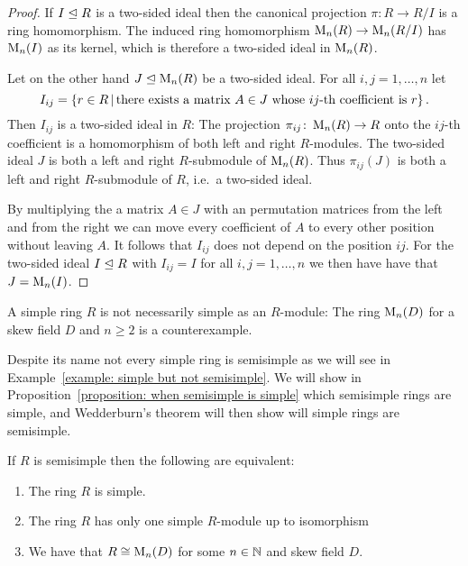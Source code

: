 \begin{proof}
  If $I \trianglelefteq R$ is a two-sided ideal then the canonical projection $\pi \colon R \to R/I$ is a ring homomorphism.
  The induced ring homomorphism $\operatorname{M}_n(R) \to \operatorname{M}_n(R/I)$ has $\operatorname{M}_n(I)$ as its kernel, which is therefore a two-sided ideal in $\operatorname{M}_n(R)$.
  
  Let on the other hand $J \trianglelefteq \operatorname{M}_n(R)$ be a two-sided ideal.
  For all $i, j = 1, \dotsc, n$ let
  \[
      I_{ij}
    = \{
        r \in R
      \suchthat
        \text{there exists a matrix $A \in J$ whose $ij$-th coefficient is $r$}
      \} \,.
  \]
  Then $I_{ij}$ is a two-sided ideal in $R$:
  The projection $\pi_{ij} \colon \operatorname{M}_n(R) \to R$ onto the $ij$-th coefficient is a homomorphism of both left and right $R$-modules.
  The two-sided ideal $J$ is both a left and right $R$-submodule of $\operatorname{M}_n(R)$.
  Thus $\pi_{ij}(J)$ is both a left and right $R$-submodule of $R$, i.e.\ a two-sided ideal.
  
  By multiplying the a matrix $A \in J$ with an permutation matrices from the left and from the right we can move every coefficient of $A$ to every other position without leaving $A$.
  It follows that $I_{ij}$ does not depend on the position $ij$.
  For the two-sided ideal $I \trianglelefteq R$ with $I_{ij} = I$ for all $i, j = 1, \dotsc, n$ we then have have that $J = \operatorname{M}_n(I)$.
\end{proof}


\begin{warning}
  A simple ring $R$ is not necessarily simple as an $R$-module:
  The ring $\operatorname{M}_n(D)$ for a skew field $D$ and $n \geq 2$ is a counterexample.
\end{warning}


\begin{fluff}
  Despite its name not every simple ring is semisimple as we will see in Example~\ref{example: simple but not semisimple}.
  We will show in Proposition~\ref{proposition: when semisimple is simple} which semisimple rings are simple, and Wedderburn’s theorem will then show will simple rings are semisimple.
\end{fluff}


\begin{proposition}
  \label{proposition: when semisimple is simple}
  If $R$ is semisimple then the following are equivalent:
  \begin{enumerate}
    \item
      \label{enumerate: is simple}
      The ring $R$ is simple.
    \item
      \label{enumerate: only one simple}
      The ring $R$ has only one simple $R$-module up to isomorphism
    \item
      \label{enumerate: is a matrix ring}
      We have that $R \cong \operatorname{M}_n(D)$ for some $n \in \mathbb{N}$ and skew field $D$.
  \end{enumerate}
\end{proposition}


